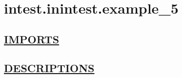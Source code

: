 \chapter*{intest.inintest.example\_5}
\hypertarget{ecldoc:toc:intest.inintest.example_5}{}

\section*{\underline{IMPORTS}}

\section*{\underline{DESCRIPTIONS}}
